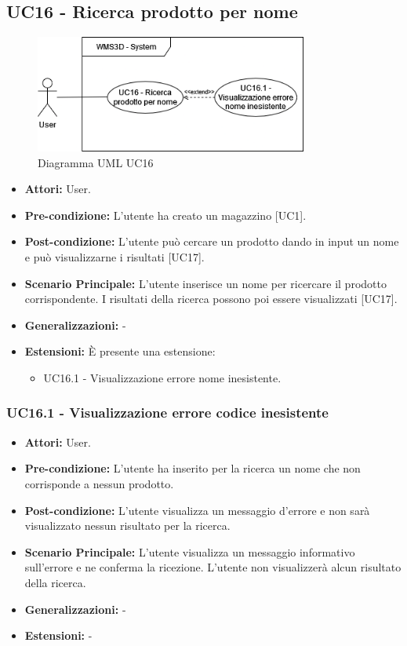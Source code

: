 \subsection{UC16 - Ricerca prodotto per nome}
\begin{figure}[H]
  \centering
  \includegraphics[width=0.8\textwidth]{UC_diagrams_11-20/UC16.drawio.png}
   \caption{Diagramma UML UC16}
\end{figure}
\begin{itemize}
    \item \textbf{Attori:} User.
    \item \textbf{Pre-condizione:} L'utente ha creato un magazzino [UC1].
    \item \textbf{Post-condizione:} L'utente può cercare un prodotto dando in input un nome e può visualizzarne i risultati [UC17].
    \item \textbf{Scenario Principale:} L'utente inserisce un nome per ricercare il prodotto corrispondente. I risultati della ricerca possono poi essere visualizzati [UC17].
    \item \textbf{Generalizzazioni:} -
    \item \textbf{Estensioni:} È presente una estensione:
    \begin{itemize}
        \item UC16.1 - Visualizzazione errore nome inesistente.
    \end{itemize}
\end{itemize}


\subsubsection{UC16.1 - Visualizzazione errore codice inesistente}
\begin{itemize}
    \item \textbf{Attori:} User.
    \item \textbf{Pre-condizione:}  L'utente ha inserito per la ricerca un nome che non corrisponde a nessun prodotto.
    \item \textbf{Post-condizione:}  L'utente visualizza un messaggio d'errore e non sarà visualizzato nessun risultato per la ricerca.
    \item \textbf{Scenario Principale:}  L'utente visualizza un messaggio informativo sull'errore e ne conferma la ricezione. L'utente non visualizzerà alcun risultato della ricerca.
    \item \textbf{Generalizzazioni:} -
    \item \textbf{Estensioni:} -
\end{itemize}
